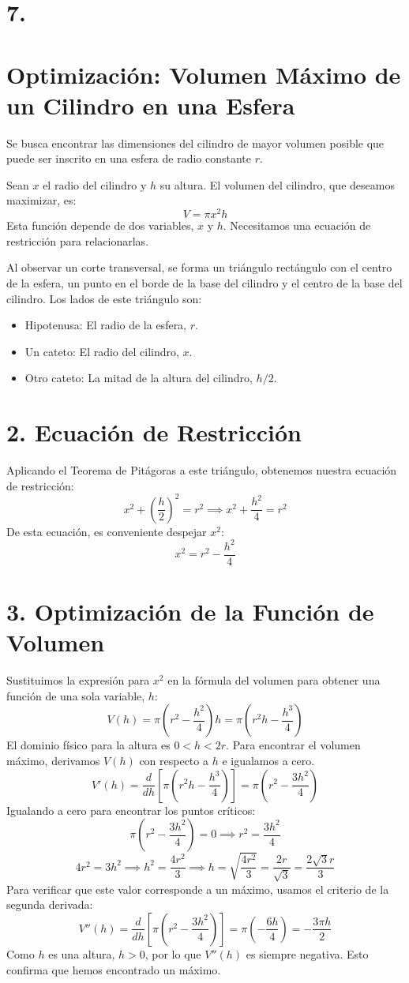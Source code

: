 \documentclass[12pt, letterpaper]{article}
\begin{document}
\section*{7.}
\section*{Optimización: Volumen Máximo de un Cilindro en una Esfera}

Se busca encontrar las dimensiones del cilindro de mayor volumen posible que puede ser inscrito en una esfera de radio constante $r$.

Sean $x$ el radio del cilindro y $h$ su altura. El volumen del cilindro, que deseamos maximizar, es:
$$ V = \pi x^2 h $$
Esta función depende de dos variables, $x$ y $h$. Necesitamos una ecuación de restricción para relacionarlas.


Al observar un corte transversal, se forma un triángulo rectángulo con el centro de la esfera, un punto en el borde de la base del cilindro y el centro de la base del cilindro. Los lados de este triángulo son:
\begin{itemize}
    \item Hipotenusa: El radio de la esfera, $r$.
    \item Un cateto: El radio del cilindro, $x$.
    \item Otro cateto: La mitad de la altura del cilindro, $h/2$.
\end{itemize}

\section*{2. Ecuación de Restricción}
Aplicando el Teorema de Pitágoras a este triángulo, obtenemos nuestra ecuación de restricción:
$$ x^2 + \left(\frac{h}{2}\right)^2 = r^2 \implies x^2 + \frac{h^2}{4} = r^2 $$
De esta ecuación, es conveniente despejar $x^2$:
$$ x^2 = r^2 - \frac{h^2}{4} $$

\section*{3. Optimización de la Función de Volumen}
Sustituimos la expresión para $x^2$ en la fórmula del volumen para obtener una función de una sola variable, $h$:
$$ V(h) = \pi \left(r^2 - \frac{h^2}{4}\right) h = \pi \left(r^2h - \frac{h^3}{4}\right) $$
El dominio físico para la altura es $0 < h < 2r$. Para encontrar el volumen máximo, derivamos $V(h)$ con respecto a $h$ e igualamos a cero.
$$ V'(h) = \frac{d}{dh} \left[ \pi \left(r^2h - \frac{h^3}{4}\right) \right] = \pi \left(r^2 - \frac{3h^2}{4}\right) $$
Igualando a cero para encontrar los puntos críticos:
$$ \pi \left(r^2 - \frac{3h^2}{4}\right) = 0 \implies r^2 = \frac{3h^2}{4} $$
$$ 4r^2 = 3h^2 \implies h^2 = \frac{4r^2}{3} \implies h = \sqrt{\frac{4r^2}{3}} = \frac{2r}{\sqrt{3}} = \frac{2\sqrt{3}r}{3} $$
Para verificar que este valor corresponde a un máximo, usamos el criterio de la segunda derivada:
$$ V''(h) = \frac{d}{dh} \left[ \pi \left(r^2 - \frac{3h^2}{4}\right) \right] = \pi \left(-\frac{6h}{4}\right) = -\frac{3\pi h}{2} $$
Como $h$ es una altura, $h>0$, por lo que $V''(h)$ es siempre negativa. Esto confirma que hemos encontrado un máximo.
\end{document}
